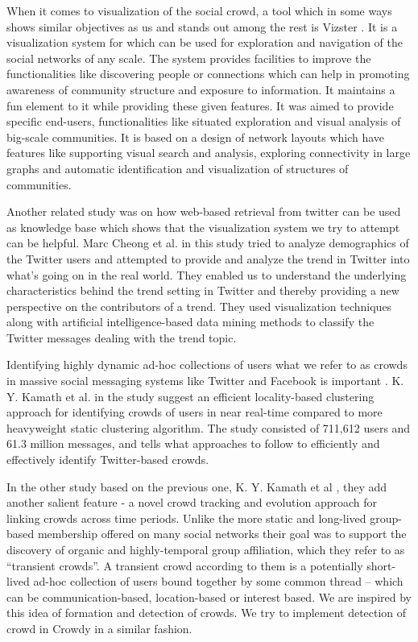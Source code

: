 \documentclass{sig-alternate}
\begin{document}
When it comes to visualization of the social crowd, a tool which in some ways
shows similar objectives as us and stands out among the rest is Vizster
\cite{Heer:2005}. It is a visualization system for which can be used for
exploration and navigation of the social networks of any scale. The system
provides facilities to improve the functionalities like discovering people or
connections which can help in promoting awareness of community structure and
exposure to information. It maintains a fun element to it while providing these
given features. It was aimed to provide specific end-users, functionalities
like situated exploration and visual analysis of big-scale communities. It is
based on a design of network layouts which have features like supporting visual
search and analysis, exploring connectivity in large graphs and automatic
identification and visualization of structures of communities.

Another related study was on how web-based retrieval from twitter can be used
as knowledge base \cite{Cheong:2009} which shows that the visualization system
we try to attempt can be helpful. Marc Cheong et al. in this study tried to
analyze demographics of the Twitter users and attempted to provide and analyze
the trend in Twitter into what's going on in the real world. They enabled us to
understand the underlying characteristics behind the trend setting in Twitter
and thereby providing a new perspective on the contributors of a trend. They
used visualization techniques along with artificial intelligence-based data
mining methods to classify the Twitter messages dealing with the trend topic.

Identifying highly dynamic ad-hoc collections of users what we refer to as
crowds in massive social messaging systems like Twitter and Facebook is
important \cite{krishna:2010}. K. Y. Kamath et al. in the study suggest an
efficient locality-based clustering approach for identifying crowds of users in
near real-time compared to more heavyweight static clustering algorithm. The
study consisted of 711,612 users and 61.3 million messages, and tells what
approaches to follow to efficiently and effectively identify Twitter-based
crowds.

In the other study based on the previous one, K. Y. Kamath et al
\cite{krishna:2011}, they add another salient feature - a novel crowd tracking
and evolution approach for linking crowds across time periods. Unlike the more
static and long-lived group-based membership offered on many social networks
their goal was to support the discovery of organic and highly-temporal group
affiliation, which they refer to as ``transient crowds''. A transient crowd
according to them is a potentially short-lived ad-hoc collection of users bound
together by some common thread – which can be communication-based,
location-based or interest based. We are inspired by this idea of formation and
detection of crowds. We try to implement detection of crowd in Crowdy in a
similar fashion.
\end{document}
